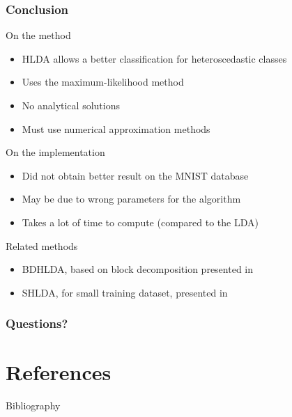 \documentclass[smaller,pdf,svgnames]{beamer}
\begin{document}
\begin{frame}
  \frametitle{Conclusion}

  \begin{block}{On the method}
    \begin{itemize}
    \item HLDA allows a better classification for heteroscedastic classes
    \item Uses the maximum-likelihood method
    \item No analytical solutions
    \item Must use numerical approximation methods
    \end{itemize}
  \end{block}

  \begin{block}{On the implementation}
    \begin{itemize}
    \item Did not obtain better result on the MNIST database
    \item May be due to wrong parameters for the algorithm
    \item Takes a lot of time to compute (compared to the LDA)
    \end{itemize}
  \end{block}

  \begin{block}{Related methods}
    \begin{itemize}
      \item BDHLDA, based on block decomposition presented in \cite{zhang2011}
      \item SHLDA, for small training dataset, presented in \cite{burget.2004}
    \end{itemize}
  \end{block}
\end{frame}

\begin{frame}
  \frametitle{Questions?}
\end{frame}

\section{References}

\begin{frame}[allowframebreaks]{Bibliography}
  \footnotesize
  
  
\end{frame}
\end{document}
